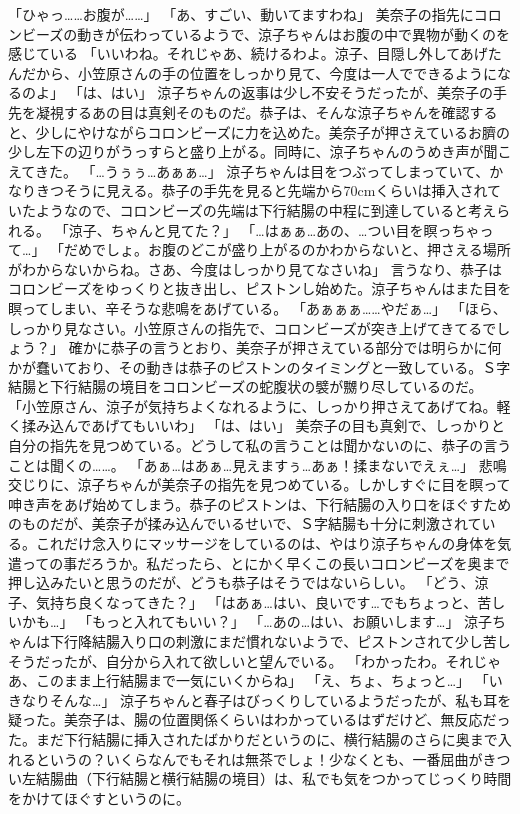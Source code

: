「ひゃっ……お腹が……」
「あ、すごい、動いてますわね」
美奈子の指先にコロンビーズの動きが伝わっているようで、涼子ちゃんはお腹の中で異物が動くのを感じている
「いいわね。それじゃあ、続けるわよ。涼子、目隠し外してあげたんだから、小笠原さんの手の位置をしっかり見て、今度は一人でできるようになるのよ」
「は、はい」
涼子ちゃんの返事は少し不安そうだったが、美奈子の手先を凝視するあの目は真剣そのものだ。恭子は、そんな涼子ちゃんを確認すると、少しにやけながらコロンビーズに力を込めた。美奈子が押さえているお臍の少し左下の辺りがうっすらと盛り上がる。同時に、涼子ちゃんのうめき声が聞こえてきた。
「…うぅぅ…あぁぁ…」
涼子ちゃんは目をつぶってしまっていて、かなりきつそうに見える。恭子の手先を見ると先端から70cmくらいは挿入されていたようなので、コロンビーズの先端は下行結腸の中程に到達していると考えられる。
「涼子、ちゃんと見てた？」
「…はぁぁ…あの、…つい目を瞑っちゃって…」
「だめでしょ。お腹のどこが盛り上がるのかわからないと、押さえる場所がわからないからね。さあ、今度はしっかり見てなさいね」
言うなり、恭子はコロンビーズをゆっくりと抜き出し、ピストンし始めた。涼子ちゃんはまた目を瞑ってしまい、辛そうな悲鳴をあげている。
「あぁぁぁ……やだぁ…」
「ほら、しっかり見なさい。小笠原さんの指先で、コロンビーズが突き上げてきてるでしょう？」
確かに恭子の言うとおり、美奈子が押さえている部分では明らかに何かが蠢いており、その動きは恭子のピストンのタイミングと一致している。Ｓ字結腸と下行結腸の境目をコロンビーズの蛇腹状の襞が嬲り尽しているのだ。
「小笠原さん、涼子が気持ちよくなれるように、しっかり押さえてあげてね。軽く揉み込んであげてもいいわ」
「は、はい」
美奈子の目も真剣で、しっかりと自分の指先を見つめている。どうして私の言うことは聞かないのに、恭子の言うことは聞くの……。
「あぁ…はあぁ…見えますぅ…あぁ！揉まないでえぇ…」
悲鳴交じりに、涼子ちゃんが美奈子の指先を見つめている。しかしすぐに目を瞑って呻き声をあげ始めてしまう。恭子のピストンは、下行結腸の入り口をほぐすためのものだが、美奈子が揉み込んでいるせいで、Ｓ字結腸も十分に刺激されている。これだけ念入りにマッサージをしているのは、やはり涼子ちゃんの身体を気遣っての事だろうか。私だったら、とにかく早くこの長いコロンビーズを奥まで押し込みたいと思うのだが、どうも恭子はそうではないらしい。
「どう、涼子、気持ち良くなってきた？」
「はあぁ…はい、良いです…でもちょっと、苦しいかも…」
「もっと入れてもいい？」
「…あの…はい、お願いします…」
涼子ちゃんは下行降結腸入り口の刺激にまだ慣れないようで、ピストンされて少し苦しそうだったが、自分から入れて欲しいと望んでいる。
「わかったわ。それじゃあ、このまま上行結腸まで一気にいくからね」
「え、ちょ、ちょっと…」
「いきなりそんな…」
涼子ちゃんと春子はびっくりしているようだったが、私も耳を疑った。美奈子は、腸の位置関係くらいはわかっているはずだけど、無反応だった。まだ下行結腸に挿入されたばかりだというのに、横行結腸のさらに奥まで入れるというの？いくらなんでもそれは無茶でしょ！少なくとも、一番屈曲がきつい左結腸曲（下行結腸と横行結腸の境目）は、私でも気をつかってじっくり時間をかけてほぐすというのに。
